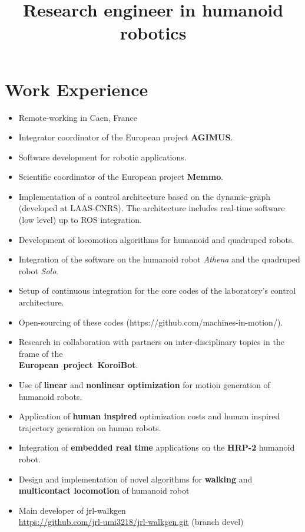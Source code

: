 \documentclass[11pt,a4paper]{moderncv}
\title{Research engineer in humanoid robotics}
\newcommand{\items}{\item[*] \hspace{2mm}}
\begin{document}
\maketitle

\section{Work Experience}

{
  \begin{itemize}%
    \items Remote-working in Caen, France
    \items Integrator coordinator of the European project \textbf{AGIMUS}.
    \items Software development for robotic applications.
  \end{itemize}
}

{
  \begin{itemize}%
    \items Scientific coordinator of the European project \textbf{Memmo}.
  \end{itemize}
}

{
  \begin{itemize}%
    \items Implementation of a control architecture based on the dynamic-graph
           (developed at LAAS-CNRS).
           The architecture includes real-time software (low level) up to ROS
           integration.
    \items Development of locomotion algorithms for humanoid and quadruped
           robots.
    \items Integration of the software on the humanoid robot \emph{Athena} and
           the quadruped robot \emph{Solo}.
    \items Setup of continuous integration for the core codes of the
           laboratory's control architecture.
    \items Open-sourcing of these codes (https://github.com/machines-in-motion/).
  \end{itemize}
}

{
\begin{itemize}%
\items Research in collaboration with partners on inter-disciplinary topics in the frame of the\\ \textbf{European~project~KoroiBot}.
\items Use of \textbf{linear} and \textbf{nonlinear optimization} for motion generation of humanoid robots.
\items Application of \textbf{human inspired} optimization costs and human inspired trajectory generation on human robots.
\items Integration of \textbf{embedded real time} applications on the \textbf{HRP-2} humanoid robot.
\items Design and implementation of novel algorithms for \textbf{walking} and \textbf{multicontact locomotion} of humanoid robot
\items Main developer of jrl-walkgen\\ \url{https://github.com/jrl-umi3218/jrl-walkgen.git} (branch devel)
\newline{}
\end{itemize}
}
\end{document}
